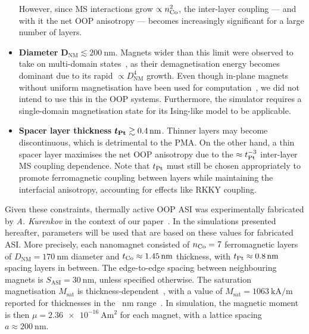 \begin{itemize}
	However, since MS interactions grow $\propto n_{\ce{Co}}^2$, the inter-layer coupling --- and with it the net OOP anisotropy --- becomes increasingly significant for a large number of layers.
	\item \textbf{Diameter} $\boldsymbol{D_\mathrm{NM}} \lesssim \SI{200}{\nano\metre}$. \newline
	Magnets wider than this limit were observed to take on multi-domain states~\cite{KUR-24}, as their demagnetisation energy becomes dominant due to its rapid $\propto D_\mathrm{NM}^4$ growth.
	Even though in-plane magnets without uniform magnetisation have been used for computation~\cite{gartside2022reconfigurable}, we did not intend to use this in the OOP systems.
	Furthermore, the \hotspice simulator requires a single-domain magnetisation state for its Ising-like model to be applicable. %
	\item \textbf{Spacer layer thickness} $\boldsymbol{t_{\ce{Pt}}} \gtrsim \SI{0.4}{\nano\metre}$. \newline
	Thinner layers may become discontinuous, which is detrimental to the PMA.
	On the other hand, a thin spacer layer maximises the net OOP anisotropy due to the $\approx t_{\ce{Pt}}^{-3}$ inter-layer MS coupling dependence.
	Note that $t_{\ce{Pt}}$ must still be chosen appropriately to promote ferromagnetic coupling between layers while maintaining the interfacial anisotropy, accounting for effects like RKKY coupling.
\end{itemize}

Given these constraints, thermally active OOP ASI was experimentally fabricated by \textit{A. Kurenkov} in the context of our paper~\cite{KUR-24}.
In the simulations presented hereafter, parameters will be used that are based on these values for fabricated ASI.
More precisely, each nanomagnet consisted of $n_{\ce{Co}}=7$ ferromagnetic layers of $D_\mathrm{NM}=\SI{170}{\nano\metre}$ diameter and $t_{\ce{Co}} \approx \SI{1.45}{\nano\metre}$ thickness, with $t_{\ce{Pt}} \approx \SI{0.8}{\nano\metre}$ spacing layers in between.
The edge-to-edge spacing between neighbouring magnets is $S_\mathrm{ASI}=\SI{30}{\nano\metre}$, unless specified otherwise.
The saturation magnetisation $M_\mathrm{sat}$ is thickness-dependent~\cite{CoFilmPropertiesCVD}, with a value of $M_\mathrm{sat}=\SI{1063}{\kilo\ampere\per\metre}$ reported for thicknesses in the \SI{}{\nano\metre} range~\cite{Msat_Co}.
In simulation, the magnetic moment is then $\mu = \SI{2.36e-16}{\ampere\metre\squared}$ for each magnet, with a lattice spacing $a \approx \SI{200}{\nano\metre}$. %

